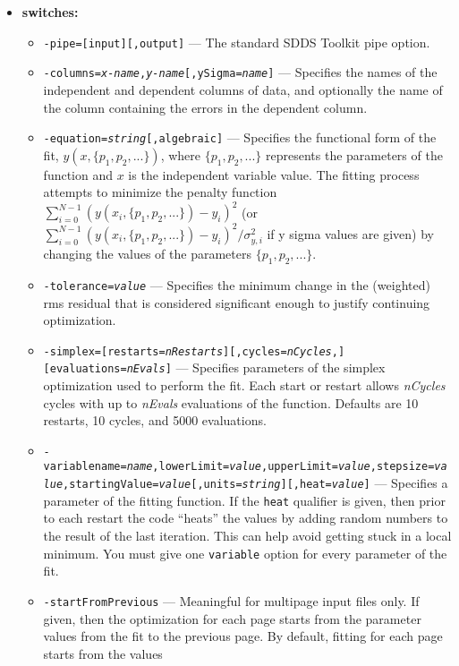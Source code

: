 \begin{itemize}
\item {\bf switches:}
    \begin{itemize}
    \item {\tt -pipe=[input][,output]} --- The standard SDDS Toolkit pipe option.
    \item {\tt -columns={\em x-name},{\em y-name}[,ySigma={\em name}]} 
        --- Specifies the names of the independent and dependent columns of data, and
        optionally the name of the column containing the errors in the dependent column.
    \item {\tt -equation={\em string}[,algebraic]} --- Specifies the functional form of the fit, $y(x, \{p_1, p_2, ...\})$,
      where $\{p_1, p_2, ...\}$ represents the parameters of the function and $x$ is the independent variable value.
      The fitting process attempts to minimize the penalty function $\sum_{i=0}^{N-1} (y(x_i, \{p_1, p_2, ...\}) - y_i)^2$ 
      (or $\sum_{i=0}^{N-1} (y(x_i, \{p_1, p_2, ...\}) - y_i)^2/\sigma_{y,i}^2$ if y sigma values are given)
      by changing the values of the parameters $\{p_1, p_2, ...\}$.
    \item {\tt -tolerance={\em value}} --- Specifies the minimum change in the (weighted) 
           rms residual that is considered significant
           enough to justify continuing optimization.
    \item {\tt -simplex=[restarts={\em nRestarts}][,cycles={\em nCycles},][evaluations={\em nEvals}]} ---
           Specifies parameters of the simplex optimization used to perform the fit.
           Each start or restart allows {\em nCycles} cycles
           with up to {\em nEvals} evaluations of the function.  
           Defaults are 10 restarts, 10 cycles, and 5000 evaluations.
    \item {\tt -variablename={\em name},lowerLimit={\em value},upperLimit={\em value},stepsize={\em value},startingValue={\em value}[,units={\em string}][,heat={\em value}]} --- 
        Specifies a parameter of the fitting function.  If the \verb|heat| qualifier is
        given, then prior to each restart the code ``heats'' the values by adding random
        numbers to the result of the last iteration.  This can help avoid getting stuck
        in a local minimum.  You must give one \verb|variable| option for every parameter
        of the fit.
    \item {\tt -startFromPrevious} --- Meaningful for multipage input files only.  If given,
        then the optimization for each page starts from the parameter values from the fit
        to the previous page.  By default, fitting for each page starts from the values

\end{itemize}
\end{itemize}
